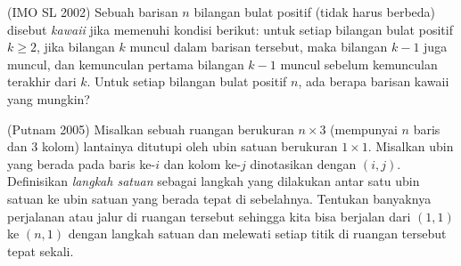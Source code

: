 \documentclass[11pt]{scrartcl}
\begin{document}
\begin{soaljawab}
    (IMO SL 2002) Sebuah barisan $n$ bilangan bulat positif (tidak harus berbeda) disebut \textit{kawaii} jika memenuhi kondisi berikut: untuk setiap bilangan bulat positif $k \ge 2$, jika bilangan $k$ muncul dalam barisan tersebut, maka bilangan $k-1$ juga muncul, dan kemunculan pertama bilangan $k-1$ muncul sebelum kemunculan terakhir dari $k$. Untuk setiap bilangan bulat positif $n$, ada berapa barisan kawaii yang mungkin?
\end{soaljawab}

\begin{soaljawab}
    (Putnam 2005) Misalkan sebuah ruangan berukuran $n \times 3$ (mempunyai $n$ baris dan $3$ kolom) lantainya ditutupi oleh ubin satuan berukuran $1 \times 1$. Misalkan ubin yang berada pada baris ke-$i$ dan kolom ke-$j$ dinotasikan dengan $(i,j)$. Definisikan \textit{langkah satuan} sebagai langkah yang dilakukan antar satu ubin satuan ke ubin satuan yang berada tepat di sebelahnya. Tentukan banyaknya perjalanan atau jalur di ruangan tersebut sehingga kita bisa berjalan dari $(1,1)$ ke $(n,1)$ dengan langkah satuan dan melewati setiap titik di ruangan tersebut tepat sekali.
\end{soaljawab}
\end{document}
